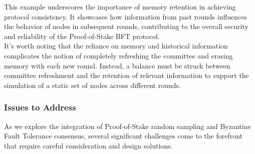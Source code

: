 This example underscores the importance of memory retention in achieving protocol consistency. It showcases how information from past rounds influences the behavior of nodes in subsequent rounds, contributing to the overall security and reliability of the Proof-of-Stake BFT protocol.\\
It's worth noting that the reliance on memory and historical information complicates the notion of completely refreshing the committee and erasing memory with each new round. Instead, a balance must be struck between committee refreshment and the retention of relevant information to support the simulation of a static set of nodes across different rounds.

\subsubsection{Issues to Address}
As we explore the integration of Proof-of-Stake random sampling and Byzantine Fault Tolerance consensus, several significant challenges come to the forefront that require careful consideration and design solutions.

